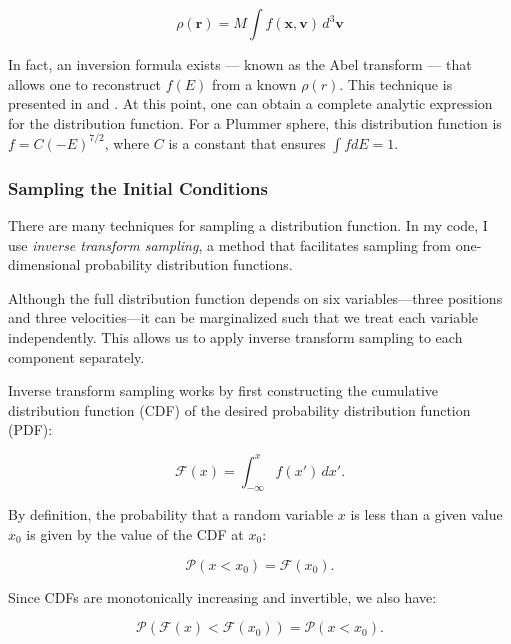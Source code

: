         \[
        \rho(\mathbf{r}) = M \int f(\mathbf{x}, \mathbf{v}) \, d^3\mathbf{v}
        \]

        In fact, an inversion formula exists — known as the Abel transform — that allows one to reconstruct \( f(E) \) from a known \( \rho(r) \). This technique is presented in \citet{2008gady.book.....B} and \citet{bovy_inprep}. At this point, one can obtain a complete analytic expression for the distribution function. For a Plummer sphere, this distribution function is $f = C (-E)^{7/2}$, where $C$ is a constant that ensures $\int f dE =1$. 

        \subsubsection{Sampling the Initial Conditions}

            There are many techniques for sampling a distribution function. In my code, I use \textit{inverse transform sampling}, a method that facilitates sampling from one-dimensional probability distribution functions.

            Although the full distribution function depends on six variables—three positions and three velocities—it can be marginalized such that we treat each variable independently. This allows us to apply inverse transform sampling to each component separately.

            Inverse transform sampling works by first constructing the cumulative distribution function (CDF) of the desired probability distribution function (PDF):

            \begin{equation}
                \mathcal{F}(x) = \int_{-\infty}^{x} f(x')\,dx'.
            \end{equation}

            By definition, the probability that a random variable $x$ is less than a given value $x_0$ is given by the value of the CDF at $x_0$:

            \begin{equation}
                \mathcal{P}(x < x_0) = \mathcal{F}(x_0).
            \end{equation}

            Since CDFs are monotonically increasing and invertible, we also have:

            \begin{equation}
                \mathcal{P}(\mathcal{F}(x) < \mathcal{F}(x_0)) = \mathcal{P}(x < x_0).
            \end{equation}

